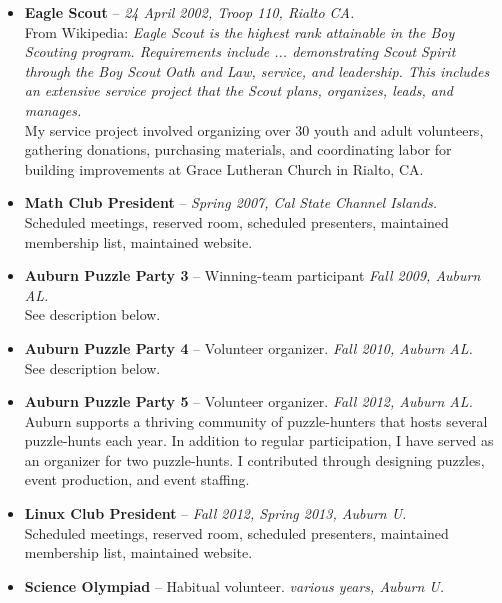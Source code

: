 \documentclass[11pt]{article}
\begin{document}
  \begin{itemize}
    \item{}
      {\bf Eagle Scout} --
      {\em 24 April 2002, Troop 110, Rialto CA.}\\
        From Wikipedia: {\em Eagle Scout is the highest rank attainable
        in the Boy Scouting program. Requirements include ...
        demonstrating Scout Spirit through the Boy Scout Oath and Law,
        service, and leadership. This includes an extensive service
        project that the Scout plans, organizes, leads, and manages.}\\
        My service project involved organizing over 30 youth and adult
        volunteers, gathering donations, purchasing materials, and
        coordinating labor for building improvements at Grace Lutheran
        Church in Rialto, CA.
    \item{}
      {\bf Math Club President} --
      {\em Spring 2007, Cal State Channel Islands.}\\
        Scheduled meetings, reserved room, scheduled presenters,
        maintained membership list, maintained website.
    \item{}
      {\bf Auburn Puzzle Party 3} --
      {Winning-team participant}
      {\em Fall 2009, Auburn AL.}\\
        See description below.
    \item{}
      {\bf Auburn Puzzle Party 4} --
      {Volunteer organizer.}
      {\em Fall 2010, Auburn AL.}\\
        See description below.
    \item{}
      {\bf Auburn Puzzle Party 5} --
      {Volunteer organizer.}
      {\em Fall 2012, Auburn AL.}\\
        Auburn supports a thriving community of puzzle-hunters that
        hosts several puzzle-hunts each year. In addition to regular
        participation, I have served as an organizer for two
        puzzle-hunts. I contributed through designing puzzles, event
        production, and event staffing.
    \item{}
      {\bf Linux Club President} --
      {\em Fall 2012, Spring 2013, Auburn U.}\\
        Scheduled meetings, reserved room, scheduled presenters,
        maintained membership list, maintained website.
    \item{}
      {\bf Science Olympiad} --
      {Habitual volunteer.}
      {\em various years, Auburn U.}\\

\end{itemize}
\end{document}
